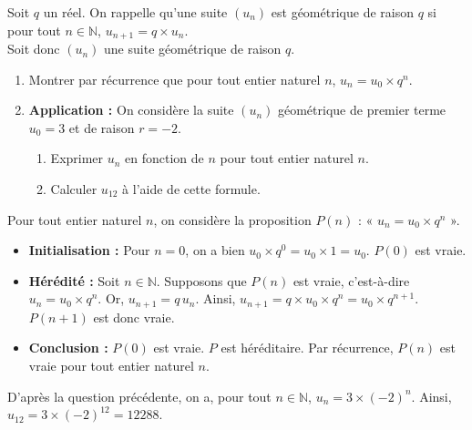 \documentclass[11pt,fleqn]{book} %
\begin{document}
\begin{exercise}[topic=rec01]Soit $q$ un réel. On rappelle qu'une suite $(u_n)$ est géométrique de raison $q$ si pour tout $n\in\mathbb{N}$, $u_{n+1}=q\times u_n$. \\Soit donc $(u_n)$ une suite géométrique de raison $q$.
\begin{enumerate}
\item Montrer par récurrence que pour tout entier naturel $n$, $u_n=u_0 \times q^n$.
\item \textbf{Application :} On considère la suite $(u_n)$ géométrique de premier terme $u_0=3$ et de raison $r=-2$.
\begin{enumerate}
\item Exprimer $u_n$ en fonction de $n$ pour tout entier naturel $n$.
\item Calculer $u_{12}$ à l'aide de cette formule.
\end{enumerate}
\end{enumerate}\end{exercise}
\begin{solution}Pour tout entier naturel $n$, on considère la proposition $P(n)$ : « $u_n=u_0 \times q^n $ ».
\begin{itemize}
\item \textbf{Initialisation :} Pour $n=0$, on a bien $u_0 \times q^0=u_0 \times 1 = u_0$. $P(0)$ est vraie.
\item \textbf{Hérédité :} Soit $n\in\mathbb{N}$. Supposons que $P(n)$ est vraie, c'est-à-dire $u_n=u_0 \times q^n$. Or, $u_{n+1}=q\,u_n$. Ainsi, $u_{n+1}=q \times u_0 \times q^n=u_0 \times q^{n+1}$. $P(n+1)$ est donc vraie.
\item \textbf{Conclusion :} $P(0)$ est vraie. $P$ est héréditaire. Par récurrence, $P(n)$ est vraie pour tout entier naturel $n$.
\end{itemize}

D'après la question précédente, on a, pour tout  $n\in\mathbb{N}$, $u_n=3 \times (-2)^n$. Ainsi, $u_{12}=3 \times (-2)^{12}=12288$.\end{solution}
\end{document}
